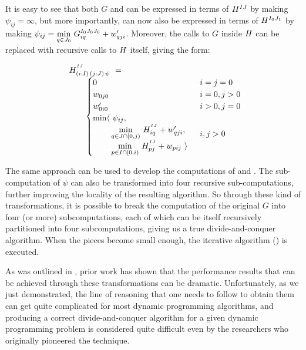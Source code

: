 It is easy to see that both $G$ and  can be expressed in terms of $H^{IJ}$ by making $\psi_{ij}=\infty$, 
but more importantly,  can now also be expressed in terms of $H^{I_0J_1}$ by making 
$\psi_{ij} =  \underset{q\in J_0}\min ~ G^{I_0J_0J_0}_{iq} + w'_{qji}$.
Moreover, the calls to $G$ inside $H$ can be replaced with recursive calls to $H$ itself,
giving the form: 

\begin{equation}\LeftEqNo
\begin{array}{l@{}l}
	\Ggen^{^{IJ}}_{(i:I)\,(j:J)\,\psi} ~=~  \\
	\qquad
	\begin{cases}
		0                         & i=j=0 \\
		w_{0j0}                   & i=0, j>0 \\
		w'_{0i0}                  & i>0, j=0 \\
		\begin{array}{@{}l@{~}l}
		  \min\langle & \psi_{ij}, \\
		              & \!\underset{q\in J\cap[0,j)}\min ~ H^{^{IJ}}_{iq} + \yw{qji}, \\
		              & \!\underset{p\in I\cap[0,i)}\min ~ H^{^{IJ}}_{pj} + \xw{pij}~\rangle
		\end{array}              & i,j>0
	\end{cases}
\end{array}
\end{equation}

The same approach can be used to develop the computations of  and .
The sub-computation of $\psi$ can also be transformed into four recursive sub-computations, further improving the locality of the resulting algorithm.
So through these kind of transformations, it is possible to break the computation of the original $G$ into four (or more) subcomputations, each of which can be itself recursively partitioned into four subcomputations, giving us a true divide-and-conquer algorithm.
When the pieces become small enough, the iterative algorithm () is executed.

\medskip
As was outlined in , prior work has shown that the performance results that can be achieved through these transformations can be dramatic. Unfortunately, as we just demonstrated, the line of reasoning that one needs to follow to obtain them can get quite complicated for most dynamic programming algorithms, and producing a correct divide-and-conquer algorithm for a given dynamic programming problem is considered quite difficult even by the researchers who originally pioneered the technique. 

